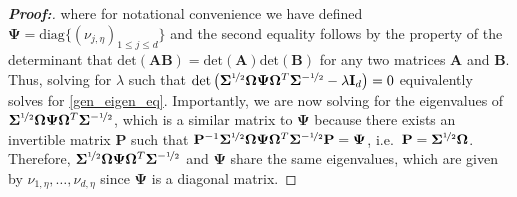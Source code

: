 \documentclass[11pt,twoside]{article}
\theoremstyle{definition}
\theoremstyle{remark}
\begin{document}
\begin{proof}[\textbf{Proof:}]
     where for notational convenience we have defined $\mathbf{\Psi} = \text{diag}\{(\nu_{j, \eta})_{1 \leq j \leq d} \}$ and the second equality follows by the property of the determinant that $\text{det}(\mathbf{A} \mathbf{B}) = \text{det}(\mathbf{A}) \text{det}(\mathbf{B})$ for any two matrices $\mathbf{A}$ and $\mathbf{B}$. Thus, solving for $\lambda$ such that $\text{det}\left( \mathbf{\Sigma}^{\nicefrac{1}{2}} \mathbf{\Omega} \mathbf{\Psi} \mathbf{\Omega}^T \mathbf{\Sigma}^{-\nicefrac{1}{2}} - \lambda \mathbf{I}_d \right) = 0$ equivalently solves for \cref{gen_eigen_eq}. Importantly, we are now solving for the eigenvalues of $\mathbf{\Sigma}^{\nicefrac{1}{2}} \mathbf{\Omega} \mathbf{\Psi} \mathbf{\Omega}^T \mathbf{\Sigma}^{-\nicefrac{1}{2}}$, which is a similar matrix to $\mathbf{\Psi}$ because there exists an invertible matrix $\mathbf{P}$ such that $\mathbf{P}^{-1} \mathbf{\Sigma}^{\nicefrac{1}{2}} \mathbf{\Omega} \mathbf{\Psi} \mathbf{\Omega}^T \mathbf{\Sigma}^{-\nicefrac{1}{2}} \mathbf{P} = \mathbf{\Psi}$, i.e.\ $\mathbf{P} = \mathbf{\Sigma}^{\nicefrac{1}{2}} \mathbf{\Omega}$. Therefore, $\mathbf{\Sigma}^{\nicefrac{1}{2}} \mathbf{\Omega} \mathbf{\Psi} \mathbf{\Omega}^T \mathbf{\Sigma}^{-\nicefrac{1}{2}}$ and $\mathbf{\Psi}$ share the same eigenvalues, which are given by $\nu_{1, \eta}, \ldots, \nu_{d, \eta}$ since $\mathbf{\Psi}$ is a diagonal matrix.


\end{proof}
\end{document}
